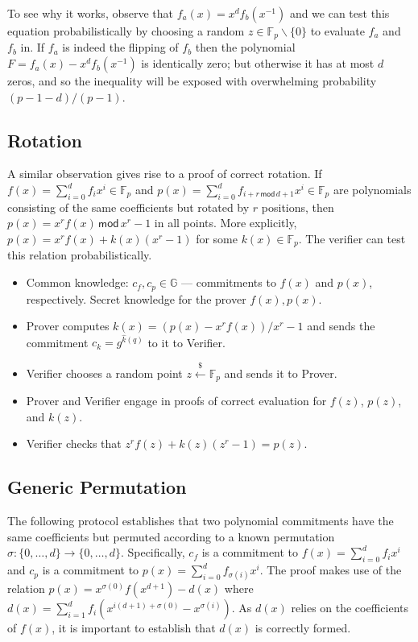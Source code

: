 \documentclass{article}
\theoremstyle{definition}
\begin{document}
To see why it works, observe that $f_a(x) = x^df_b(x^{-1})$ and we can test this equation probabilistically by choosing a random $z \in \mathbb{F}_p \backslash \{0\}$ to evaluate $f_a$ and $f_b$ in. If $f_a$ is indeed the flipping of $f_b$ then the polynomial $F = f_a(x) - x^df_b(x^{-1})$ is identically zero; but otherwise it has at most $d$ zeros, and so the inequality will be exposed with overwhelming probability $(p-1-d)/(p-1)$.

\subsection{Rotation}

A similar observation gives rise to a proof of correct rotation. If $f(x) = \sum_{i=0}^d f_i x^i \in \mathbb{F}_p$ and $p(x) = \sum_{i=0}^d f_{i+r \, \mathsf{mod} \, d+1} x^i \in \mathbb{F}_p$ are polynomials consisting of the same coefficients but rotated by $r$ positions, then $p(x) = x^r f(x) \, \mathsf{mod} \, x^r - 1$ in all points. More explicitly, $p(x) = x^r f(x) + k(x) (x^r - 1)$ for some $k(x) \in \mathbb{F}_p$. The verifier can test this relation probabilistically.

\begin{itemize}
    \item Common knowledge: $c_f, c_p \in \mathbb{G}$ --- commitments to $f(x)$ and $p(x)$, respectively. Secret knowledge for the prover $f(x), p(x)$.
    \item Prover computes $k(x) = (p(x) - x^r f(x)) / x^r - 1$ and sends the commitment $c_k = g^{\hat{k}(q)}$ to it to Verifier.
    \item Verifier chooses a random point $z \xleftarrow{\$} \mathbb{F}_p$ and sends it to Prover.
    \item Prover and Verifier engage in proofs of correct evaluation for $f(z)$, $p(z)$, and $k(z)$.
    \item Verifier checks that $z^r f(z) + k(z) (z^r-1) = p(z)$.
\end{itemize}

\subsection{Generic Permutation}

The following protocol establishes that two polynomial commitments have the same coefficients but permuted according to a known permutation $\sigma : \{0,\ldots,d\} \rightarrow \{0,\ldots,d\}$. Specifically, $c_f$ is a commitment to $f(x) = \sum_{i=0}^d f_i x^i$ and $c_p$ is a commitment to $p(x) = \sum_{i=0}^d f_{\sigma(i)} x^i$. The proof makes use of the relation $p(x) = x^{\sigma(0)} f(x^{d+1}) - d(x)$ where $d(x) = \sum_{i=1}^d f_i (x^{i(d+1) + \sigma(0)} - x^{\sigma(i)})$. As $d(x)$ relies on the coefficients of $f(x)$, it is important to establish that $d(x)$ is correctly formed.
\end{document}

